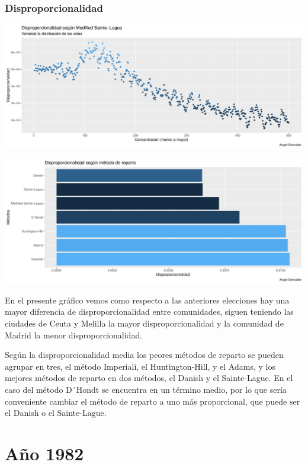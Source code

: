 \documentclass[12pt,a4paper,]{book}
\numberwithin{dummy}{section}
\theoremstyle{ocrenumbox}
\theoremstyle{blacknumex}
\theoremstyle{blacknumbox}
\theoremstyle{ocrenum}
\theoremstyle{ocrenum}
\begin{document}
\hypertarget{disproporcionalidad-1}{%
\subsubsection{Disproporcionalidad}\label{disproporcionalidad-1}}

\begin{center}\includegraphics[width=0.95\linewidth]{figurasR/unnamed-chunk-21-1} \end{center}

\begin{center}\includegraphics[width=0.95\linewidth]{figurasR/unnamed-chunk-21-2} \end{center}

En el presente gráfico vemos como respecto a las anteriores elecciones
hay una mayor diferencia de disproporcionalidad entre comunidades,
siguen teniendo las ciudades de Ceuta y Melilla la mayor
disproporcionalidad y la comunidad de Madrid la menor
disproporcionalidad.

Según la disproporcionalidad media los peores métodos de reparto se
pueden agrupar en tres, el método Imperiali, el Huntington-Hill, y el
Adams, y los mejores métodos de reparto en dos métodos, el Danish y el
Sainte-Lague. En el caso del método D´Hondt se encuentra en un término
medio, por lo que sería conveniente cambiar el método de reparto a uno
más proporcional, que puede ser el Danish o el Sainte-Lague.

\hypertarget{auxf1o-1982}{%
\section{Año 1982}\label{auxf1o-1982}}
\end{document}

